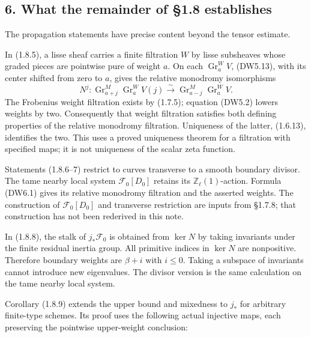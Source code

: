 \subsection{6. What the remainder of §1.8
establishes}\label{what-the-remainder-of-1.8-establishes}

The propagation statements have precise content beyond the tensor
estimate.

In (1.8.5), a lisse sheaf carries a finite filtration \(W\) by lisse
subsheaves whose graded pieces are pointwise pure of weight \(a\). On
each \(\operatorname{Gr}_a^W V\), (DW5.13), with its center shifted from
zero to \(a\), gives the relative monodromy isomorphisms \[
N^j:\operatorname{Gr}_{a+j}^M\operatorname{Gr}_a^W V(j)
\xrightarrow{\sim}
\operatorname{Gr}_{a-j}^M\operatorname{Gr}_a^W V.
\tag{DW6.1}
\] The Frobenius weight filtration exists by (1.7.5); equation (DW5.2)
lowers weights by two. Consequently that weight filtration satisfies
both defining properties of the relative monodromy filtration.
Uniqueness of the latter, (1.6.13), identifies the two. This uses a
proved uniqueness theorem for a filtration with specified maps; it is
not uniqueness of the scalar zeta function.

Statements (1.8.6--7) restrict to curves transverse to a smooth boundary
divisor. The tame nearby local system \(\mathcal F_0[D_0]\) retains its
\(\mathbb Z_\ell(1)\)-action. Formula (DW6.1) gives its relative
monodromy filtration and the asserted weights. The construction of
\(\mathcal F_0[D_0]\) and transverse restriction are inputs from §1.7.8;
that construction has not been rederived in this note.

In (1.8.8), the stalk of \(j_*\mathcal F_0\) is obtained from \(\ker N\)
by taking invariants under the finite residual inertia group. All
primitive indices in \(\ker N\) are nonpositive. Therefore boundary
weights are \(\beta+i\) with \(i\le0\). Taking a subspace of invariants
cannot introduce new eigenvalues. The divisor version is the same
calculation on the tame nearby local system.

Corollary (1.8.9) extends the upper bound and mixedness to \(j_*\) for
arbitrary finite-type schemes. Its proof uses the following actual
injective maps, each preserving the pointwise upper-weight conclusion:

